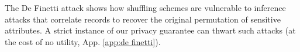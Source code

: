 The De Finetti attack \citep{definetti} shows how shuffling schemes are vulnerable to inference attacks that correlate records to recover the original permutation of sensitive attributes. A strict instance of our privacy guarantee can thwart such attacks (at the cost of no utility, App. \ref{app:de finetti}). 